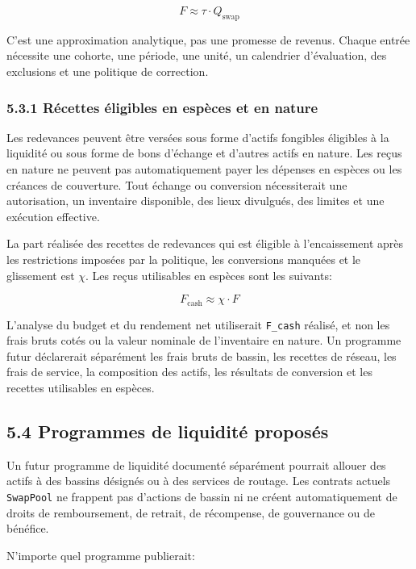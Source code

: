 \documentclass[11pt]{article}
\begin{document}
\[
F \approx \tau \cdot Q_{\mathrm{swap}}
\]

C'est une approximation analytique, pas une promesse de revenus. Chaque entrée nécessite une cohorte, une période, une unité, un calendrier d'évaluation, des exclusions et une politique de correction.

\subsubsection*{5.3.1 Récettes éligibles en espèces et en nature}

Les redevances peuvent être versées sous forme d'actifs fongibles éligibles à la liquidité ou sous forme de bons d'échange et d'autres actifs en nature. Les reçus en nature ne peuvent pas automatiquement payer les dépenses en espèces ou les créances de couverture. Tout échange ou conversion nécessiterait une autorisation, un inventaire disponible, des lieux divulgués, des limites et une exécution effective.

La part réalisée des recettes de redevances qui est éligible à l'encaissement après les restrictions imposées par la politique, les conversions manquées et le glissement est \texttt{$\chi$}. Les reçus utilisables en espèces sont les suivants:

\[
F_{\mathrm{cash}} \approx \chi \cdot F
\]

L'analyse du budget et du rendement net utiliserait \texttt{F\_cash} réalisé, et non les frais bruts cotés ou la valeur nominale de l'inventaire en nature. Un programme futur déclarerait séparément les frais bruts de bassin, les recettes de réseau, les frais de service, la composition des actifs, les résultats de conversion et les recettes utilisables en espèces.

\subsection*{5.4 Programmes de liquidité proposés}

Un futur programme de liquidité documenté séparément pourrait allouer des actifs à des bassins désignés ou à des services de routage. Les contrats actuels \texttt{SwapPool} ne frappent pas d'actions de bassin ni ne créent automatiquement de droits de remboursement, de retrait, de récompense, de gouvernance ou de bénéfice.

N'importe quel programme publierait:
\end{document}
